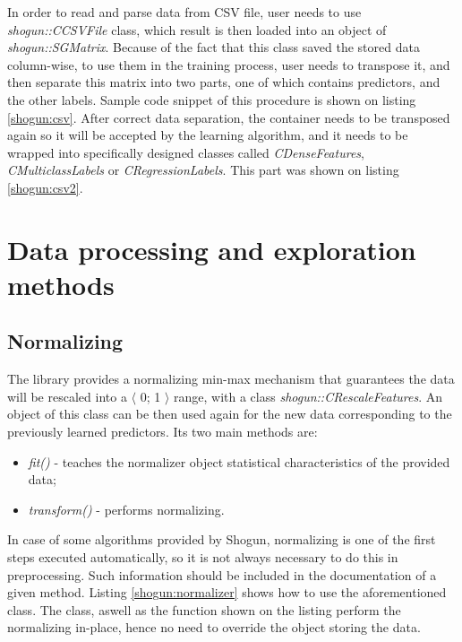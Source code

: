 In order to read and parse data from CSV file, user needs to use \textit{shogun::CCSVFile} class, which result is then loaded into an object of \textit{shogun::SGMatrix}. Because of the fact that this class saved the stored data column-wise, to use them in the training process, user needs to transpose it, and then separate this matrix into two parts, one of which contains predictors, and the other labels. Sample code snippet of this procedure is shown on listing \ref{shogun:csv}. After correct data separation, the container needs to be transposed again so it will be accepted by the learning algorithm, and it needs to be wrapped into specifically designed classes called \textit{CDenseFeatures}, \textit{CMulticlassLabels} or \textit{CRegressionLabels}. This part was shown on listing \ref{shogun:csv2}.



\section{Data processing and exploration methods}

\subsection{Normalizing}

The library provides a normalizing min-max mechanism that guarantees the data will be rescaled into a $\langle$ 0; 1 $\rangle$ range, with a class \textit{shogun::CRescaleFeatures}. An object of this class can be then used again for the new data corresponding to the previously learned predictors. Its two main methods are:

\begin{itemize}
	\item \textit{fit()} - teaches the normalizer object statistical characteristics of the provided data;
	\item \textit{transform()} - performs normalizing.
\end{itemize}

In case of some algorithms provided by Shogun, normalizing is one of the first steps executed automatically, so it is not always necessary to do this in preprocessing. Such information should be included in the documentation of a given method. Listing \ref{shogun:normalizer} shows how to use the aforementioned class. The class, aswell as the function shown on the listing perform the normalizing in-place, hence no need to override the object storing the data.

